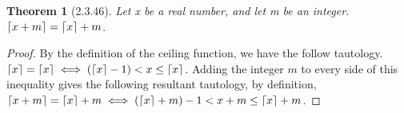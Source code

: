 \documentclass[a4paper, 12pt]{article}
\theoremstyle{plain}
\newtheorem*{theorem*}{Theorem}
\DeclarePairedDelimiter{\ceil}{\lceil}{\rceil}
\begin{document}
	
	\begin{theorem*}[2.3.46]
		Let x be a real number, and let m be an integer. \newline $\ceil{x + m} = \ceil{x} + m$.
	\end{theorem*}
	
	\begin{proof}
		By the definition of the ceiling function, we have the follow tautology.
		$\ceil{x} = \ceil{x} \iff (\ceil{x} - 1) < x \le \ceil{x}$. \newline Adding the integer $m$ to every side of this inequality gives the following resultant tautology, by definition, \newline
		$\ceil{x + m} = \ceil{x} + m \iff (\ceil{x} + m) - 1 < x + m \le \ceil{x} + m$.
	\end{proof}
\end{document}
